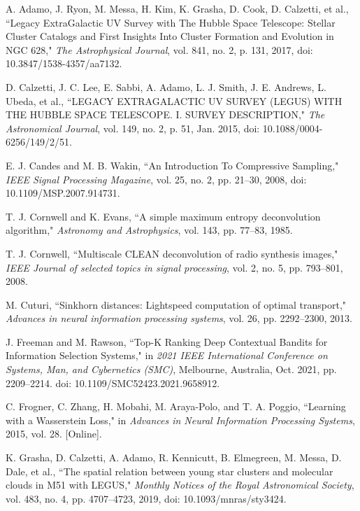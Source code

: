 \documentclass[conference]{IEEEtran}
\begin{document}
\begin{thebibliography}{00}

A. Adamo, J. Ryon, M. Messa, H. Kim, K. Grasha, D. Cook, D. Calzetti, et al., ``Legacy ExtraGalactic UV Survey with The Hubble Space Telescope: Stellar Cluster Catalogs and First Insights Into Cluster Formation and Evolution in NGC 628," \emph{The Astrophysical Journal}, vol. 841, no. 2, p. 131, 2017, doi: 10.3847/1538-4357/aa7132.

D. Calzetti, J. C. Lee, E. Sabbi, A. Adamo, L. J. Smith, J. E. Andrews, L. Ubeda, et al., ``LEGACY EXTRAGALACTIC UV SURVEY (LEGUS) WITH THE HUBBLE SPACE TELESCOPE. I. SURVEY DESCRIPTION," \emph{The Astronomical Journal}, vol. 149, no. 2, p. 51, Jan. 2015, doi: 10.1088/0004-6256/149/2/51.

E. J. Candes and M. B. Wakin, ``An Introduction To Compressive Sampling," \emph{IEEE Signal Processing Magazine}, vol. 25, no. 2, pp. 21–30, 2008, doi: 10.1109/MSP.2007.914731.

T. J. Cornwell and K. Evans, ``A simple maximum entropy deconvolution algorithm," \emph{Astronomy and Astrophysics}, vol. 143, pp. 77–83, 1985.

T. J. Cornwell, ``Multiscale CLEAN deconvolution of radio synthesis images," \emph{IEEE Journal of selected topics in signal processing}, vol. 2, no. 5, pp. 793–801, 2008.

M. Cuturi, ``Sinkhorn distances: Lightspeed computation of optimal transport," \emph{Advances in neural information processing systems}, vol. 26, pp. 2292–2300, 2013.

J. Freeman and M. Rawson, ``Top-K Ranking Deep Contextual Bandits for Information Selection Systems," in \emph{2021 IEEE International Conference on Systems, Man, and Cybernetics (SMC)}, Melbourne, Australia, Oct. 2021, pp. 2209–2214. doi: 10.1109/SMC52423.2021.9658912.

C. Frogner, C. Zhang, H. Mobahi, M. Araya-Polo, and T. A. Poggio, ``Learning with a Wasserstein Loss," in \emph{Advances in Neural Information Processing Systems}, 2015, vol. 28. [Online]. 

K. Grasha, D. Calzetti, A. Adamo, R. Kennicutt, B. Elmegreen, M. Messa, D. Dale, et al., ``The spatial relation between young star clusters and molecular clouds in M51 with LEGUS," \emph{Monthly Notices of the Royal Astronomical Society}, vol. 483, no. 4, pp. 4707–4723, 2019, doi: 10.1093/mnras/sty3424.


\end{thebibliography}
\end{document}
